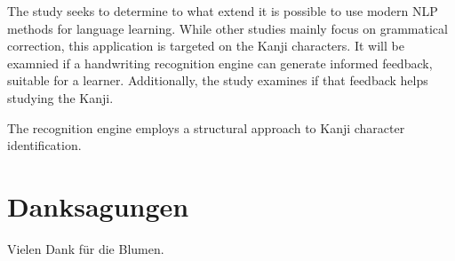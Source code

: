 The study seeks to determine to what extend it is possible to use modern NLP 
methods for language learning. While other studies mainly focus on grammatical
correction, this application is targeted on the Kanji characters. It will be 
examnied if a handwriting recognition engine can generate informed feedback,
suitable for a learner. Additionally, the study examines if that feedback helps 
studying the Kanji.

The recognition engine employs a structural approach to Kanji character 
identification. 




\chapter*{Danksagungen}
\label{chap:danksagungen}

Vielen Dank für die Blumen.
